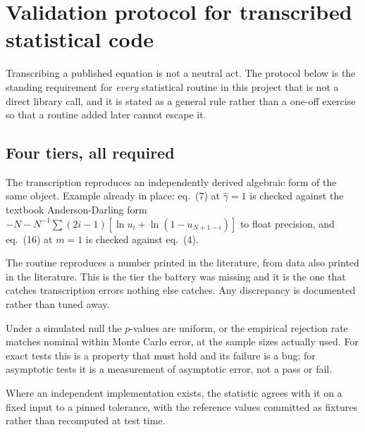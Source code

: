 \documentclass[11pt,a4paper]{article}
\newcommand{\gh}{\hat\gamma}
\begin{document}
\section{Validation protocol for transcribed statistical code}
\label{sec:validation}

Transcribing a published equation is not a neutral act. The protocol below is the
standing requirement for \emph{every} statistical routine in this project that is not a
direct library call, and it is stated as a general rule rather than a one-off exercise so
that a routine added later cannot escape it.

\subsection{Four tiers, all required}

\begin{description}[leftmargin=1.8em,itemsep=4pt]
\item[Tier 1, internal identity.] The transcription reproduces an independently derived
algebraic form of the same object. Example already in place: eq.~(7) at $\gh=1$ is
checked against the textbook Anderson-Darling form
$-N - N^{-1}\sum(2i-1)[\ln u_i + \ln(1-u_{N+1-i})]$ to float precision, and eq.~(16) at
$m=1$ is checked against eq.~(4).

\item[Tier 2, published reference value.] The routine reproduces a number printed in the
literature, from data also printed in the literature. This is the tier the battery was
missing and it is the one that catches transcription errors nothing else catches. Any
discrepancy is documented rather than tuned away.

\item[Tier 3, null calibration.] Under a simulated null the $p$-values are uniform, or
the empirical rejection rate matches nominal within Monte Carlo error, at the sample
sizes actually used. For exact tests this is a property that must hold and its failure is
a bug; for asymptotic tests it is a measurement of asymptotic error, not a pass or fail.

\item[Tier 4, cross-implementation.] Where an independent implementation exists, the
statistic agrees with it on a fixed input to a pinned tolerance, with the reference values
committed as fixtures rather than recomputed at test time.
\end{description}
\end{document}

